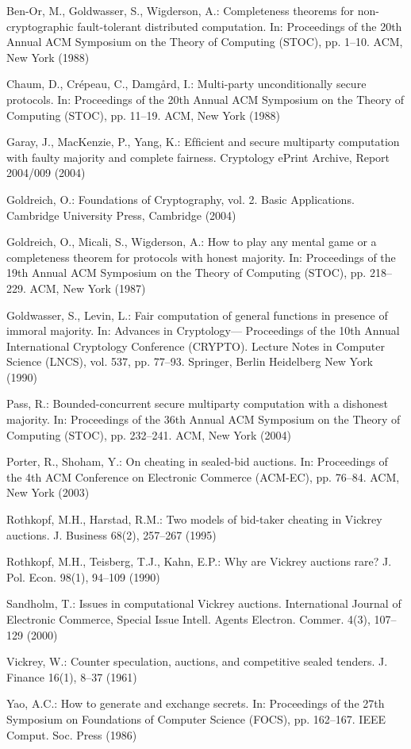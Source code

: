 \documentclass[a4paper,11pt]{article}
\begin{document}
\begin{thebibliography}{15}
	 Ben-Or, M., Goldwasser, S., Wigderson, A.: Completeness theorems for non-cryptographic fault-tolerant
	distributed computation. In: Proceedings of the 20th Annual ACM Symposium on the Theory of Computing (STOC), pp. 1–10. ACM, New York (1988)

 	 Chaum, D., Crépeau, C., Damgård, I.: Multi-party unconditionally secure protocols. In: Proceedings of the 20th Annual ACM
	Symposium on the Theory of Computing (STOC), pp. 11–19. ACM, New York (1988)

 	 Garay, J., MacKenzie, P., Yang, K.: Efﬁcient and secure multiparty computation with faulty majority and complete fairness.
	Cryptology ePrint Archive, Report 2004/009 (2004)

 	 Goldreich, O.: Foundations of Cryptography, vol. 2. Basic Applications. Cambridge University Press, Cambridge (2004)

 	 Goldreich, O., Micali, S., Wigderson, A.: How to play any mental game or a completeness theorem for protocols with honest
	majority. In: Proceedings of the 19th Annual ACM Symposium on the Theory of Computing (STOC), pp. 218–229. ACM, New York (1987)

 	 Goldwasser, S., Levin, L.: Fair computation of general functions in presence of immoral majority. In: Advances in Cryptology—
	Proceedings of the 10th Annual International Cryptology Conference (CRYPTO). Lecture Notes in Computer Science (LNCS), vol. 537, pp. 77–93.
	Springer, Berlin Heidelberg New York (1990)

 	 Pass, R.: Bounded-concurrent secure multiparty computation with a dishonest majority. In: Proceedings of the 36th Annual ACM
	Symposium on the Theory of Computing (STOC), pp. 232–241. ACM, New York (2004)

 	 Porter, R., Shoham, Y.: On cheating in sealed-bid auctions. In: Proceedings of the 4th ACM Conference on Electronic Commerce
	(ACM-EC), pp. 76–84. ACM, New York (2003)

 	 Rothkopf, M.H., Harstad, R.M.: Two models of bid-taker cheating in Vickrey auctions. J. Business 68(2), 257–267 (1995)

	 Rothkopf, M.H., Teisberg, T.J., Kahn, E.P.: Why are Vickrey auctions rare? J. Pol. Econ. 98(1), 94–109 (1990)
	
	 Sandholm, T.: Issues in computational Vickrey auctions. International Journal of Electronic Commerce, Special Issue Intell. Agents Electron. Commer. 4(3), 107–129 (2000)
	
	 Vickrey, W.: Counter speculation, auctions, and competitive sealed tenders. J. Finance 16(1), 8–37 (1961)
	
	 Yao, A.C.: How to generate and exchange secrets. In: Proceedings of the 27th Symposium on Foundations of Computer Science (FOCS), pp. 162–167. IEEE Comput. Soc. Press (1986)
\end{thebibliography}
\end{document}
